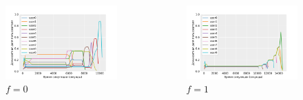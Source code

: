 \documentclass[t]{beamer}  %
\begin{document}
\begin{frame}[fragile]
	\begin{columns}
		\begin{column}{0.65\linewidth}
			\begin{figure}[H]
				\centering 
					\includegraphics[width=\linewidth]{images/fair_share_0}
					\caption*{$f = 0$}
				\end{figure}
		\end{column}
		\hspace{-1cm}
		\begin{column}{0.65\linewidth}
			\begin{figure}[H]
				\centering 
					\includegraphics[width=\linewidth]{images/fair_share_1}
					\caption*{$f = 1$}
				\end{figure}
		\end{column}
	\end{columns}

	
\end{frame}
\end{document}
